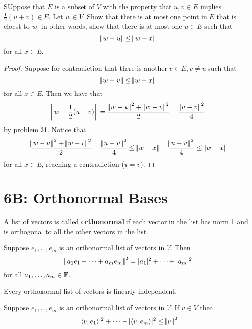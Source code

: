 \documentclass{extarticle}
\begin{document}
\begin{problem}{32}
    SUppose that \(E\) is a subset of \(V\) with the property that \(u, v \in E\) implies 
    \(\frac{1}{2}(u+v) \in E\). Let \(w \in V\). Show that there is at most one point in \(E\) 
    that is cloest to \(w\). In other words, show that there is at most one \(u \in E\) such that 
    \[\norm{w - u} \leq \norm{w - x}\] 
    for all \(x \in E\).
\end{problem}

\begin{proof}
Suppose for contradiction that there is another \(v \in E, v \neq u\) such that 
\[\norm{w - v} \leq \norm{w - x}\]
for all \(x \in E\). Then we have that 
\[\norm{w - \frac{1}{2}(u+v)} = \frac{\norm{w - u}^2 + \norm{w - v}^2}{2} - \frac{\norm{u-v}^2}{4}\]
by problem 31. Notice that 
\[\frac{\norm{w - u}^2 + \norm{w - v}^2}{2} - \frac{\norm{u-v}^2}{4} \leq \norm{w - x} -  
\frac{\norm{u-v}^2}{4} \leq \norm{w - x}\]
for all \(x \in E\), reaching a contradiction (\(u = v\)). 
\end{proof}


\newpage 
\section*{6B: Orthonormal Bases}

\begin{definition}[orthonormal]
    A list of vectors is called \textbf{orthonormal} if each vector in the list has norm 1 and 
    is orthogonal to all the other vectors in the list.
\end{definition}

\begin{corollary}
    Suppose \(e_1, \ldots, e_m\) is an orthonormal list of vectors in \(V\). Then 
    \[\norm{a_1 e_1 + \cdots + a_m e_m}^2 = |a_1|^2 + \cdots + |a_m|^2\]
    for all \(a_1, \ldots, a_m \in \mathbb{F}\).
\end{corollary}

\begin{corollary}
    Every orthonormal list of vectors is linearly independent. 
\end{corollary}

\begin{thm}
    Suppose \(e_1, \ldots, e_m\) is an orthonormal list of vectors in \(V\). If \(v \in V\) then 
    \[ |\langle v,e_1 \rangle|^2 + \cdots + |\langle v,e_m \rangle|^2 \leq \norm{v}^2\]
\end{thm}
\end{document}
